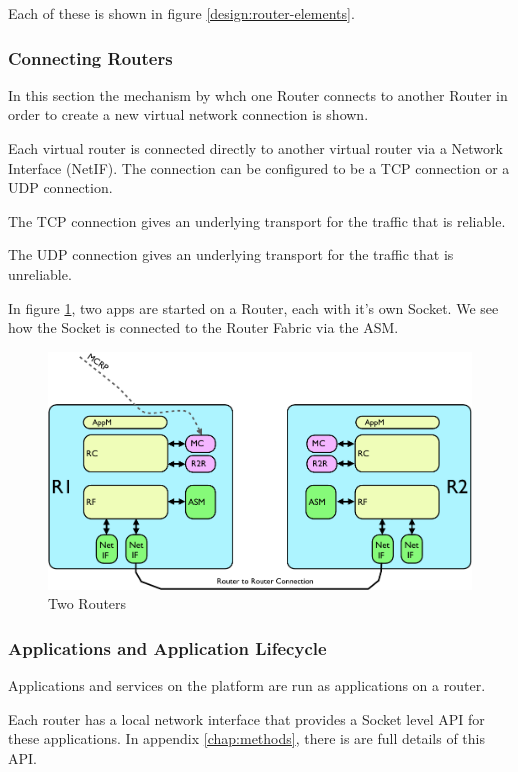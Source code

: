 \noindent Each of these is shown in figure \ref{design:router-elements}.



\subsubsection{Connecting Routers}

In this section the mechanism by whch one Router connects to another
Router in order to create a new virtual network connection is shown.

Each virtual router is connected directly to another virtual router
via a Network Interface (NetIF).
The connection can be configured to be a TCP connection or a UDP
connection.

The TCP connection gives an underlying transport for the traffic that
is reliable. 

The UDP connection gives an underlying transport for the traffic that
is unreliable.

In figure \ref{design:two-routers}, two apps are started on a Router,
each with it's own Socket.  We see how the Socket is connected to the
Router Fabric via the ASM.

\begin{figure}[h!]
    \centering
    \includegraphics[width=12cm]{images/two-routers}
    \caption{Two Routers}
    \label{design:two-routers}
\end{figure}

\subsubsection{Applications and Application Lifecycle}

Applications and services on the platform are run as applications on a router.

Each router has a local network interface that provides a Socket level
API for these applications.  In appendix \ref{chap:methods}, there is
are full details of this API.

